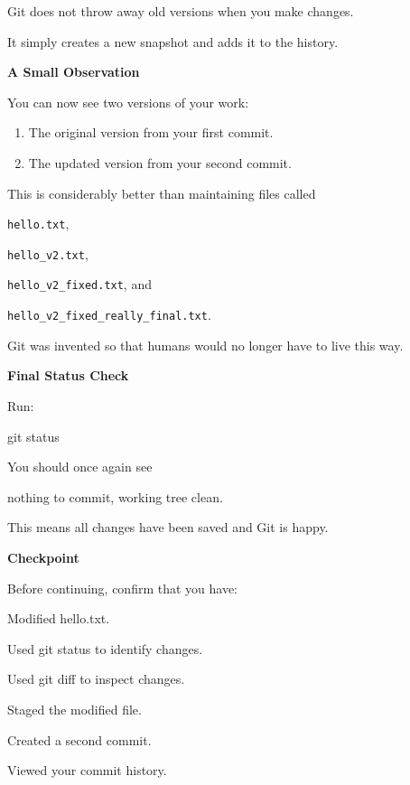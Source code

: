 \documentclass{csc2059practical}
\begin{document}
Git does not throw away old versions when you make changes.

It simply creates a new snapshot and adds it to the history.

\begin{tipbox}
\textbf{A Small Observation}\par
\medskip
You can now see two versions of your work:
\begin{enumerate}
  \item The original version from your first commit.
  \item The updated version from your second commit.
\end{enumerate}
This is considerably better than maintaining files called 

\texttt{hello.txt},

\texttt{hello\_v2.txt}, 

\texttt{hello\_v2\_fixed.txt}, and 

\texttt{hello\_v2\_fixed\_really\_final.txt}.

Git was invented so that humans would no longer have to live this way.
\end{tipbox}

\textbf{Final Status Check}\par

Run:
\begin{terminalplain}
git status
\end{terminalplain} 

You should once again see 
\begin{terminalplain}
nothing to commit, working tree clean.
\end{terminalplain}

This means all changes have been saved and Git is happy.

\begin{reflectionbox}
\textbf{Checkpoint}\par
\medskip

Before continuing, confirm that you have:


Modified hello.txt.


Used git status to identify changes.


Used git diff to inspect changes.


Staged the modified file.


Created a second commit.


Viewed your commit history.


\end{reflectionbox}
\end{document}
